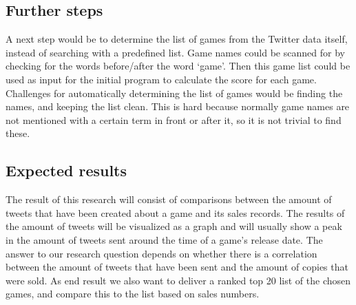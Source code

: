 \subsection{Further steps}
A next step would be to determine the list of games from the Twitter data itself, instead of searching with a predefined list. Game names could be scanned for by checking for the words before/after the word ‘game’. Then this game list could be used as input for the initial program to calculate the score for each game. Challenges for automatically determining the list of games would be finding the names, and keeping the list clean. This is hard because normally game names are not mentioned with a certain term in front or after it, so it is not trivial to find these.
\subsection{Expected results}
The result of this research will consist of comparisons between the amount of tweets that have been created about a game and its sales records. The results of the amount of tweets will be visualized as a graph and will usually show a peak in the amount of tweets sent around the time of a game’s release date. The answer to our research question depends on whether there is a correlation between the amount of tweets that have been sent and the amount of copies that were sold. As end result we also want to deliver a ranked top 20 list of the chosen games, and compare this to the list based on sales numbers.


